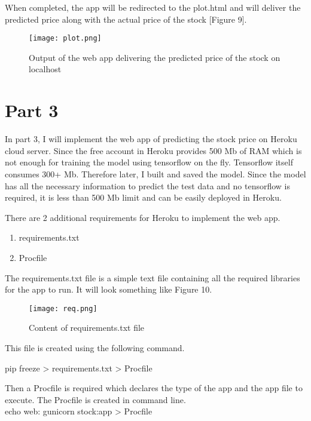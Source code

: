 \documentclass[11pt]{diazessay} %
\begin{document}
When completed, the app will be redirected to the plot.html and will deliver the predicted price along with the actual price of the stock [Figure 9].

\begin{figure}[!h]
\begin{center}
\texttt{[image: plot.png]}
\caption{Output of the web app delivering the predicted price of the stock on localhost}
\end{center}
\end{figure}

\section*{Part 3}

In part 3, I will implement the web app of predicting the stock price on Heroku cloud server. Since the free account in Heroku provides 500 Mb of RAM which is not enough for training the model using tensorflow on the fly. Tensorflow itself consumes 300+ Mb. Therefore later, I built and saved the model. Since the model has all the necessary information to predict the test data and no tensorflow is required, it is less than 500 Mb limit and can be easily deployed in Heroku.

There are 2 additional requirements for Heroku to implement the web app.

\begin{enumerate}
	\item requirements.txt
	\item Procfile
\end{enumerate}

The requirements.txt file is a simple text file containing all the required libraries for the app to run. It will look something like Figure 10.

\begin{figure}[!h]
\begin{center}
\texttt{[image: req.png]} %
\caption{Content of requirements.txt file}
\end{center}
\end{figure}

This file is created using the following command.

{\selectfont
\noindent pip freeze > requirements.txt >  Procfile\\
}

Then a Procfile is required which declares the type of the app and the app file to execute. The Procfile is created in command line.\\
{\selectfont
\noindent echo web: gunicorn stock:app >  Procfile\\
}
\end{document}
